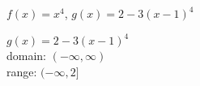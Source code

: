 {$f(x) = x^4$, $g(x) = 2 - 3(x - 1)^{4}$
}
{ $g(x) = 2 - 3(x - 1)^{4}$\\
domain: $(-\infty, \infty)$\\
range: $(-\infty, 2]$

\begin{center}
\end{center}}